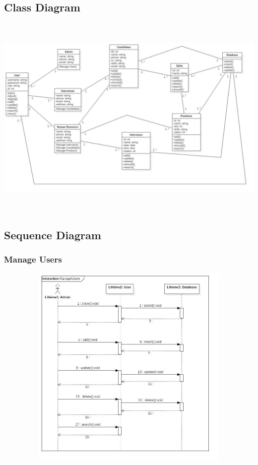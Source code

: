 \documentclass[a4paper]{article}
\begin{document}
\subsection{Class Diagram}
\includegraphics[width=15cm, height=10cm]{Diagram/Class} \\
\subsection{Sequence Diagram}
\subsubsection{Manage Users}
\includegraphics[width=15cm, height=10cm]{Diagram/ManageUser} \\
\end{document}
